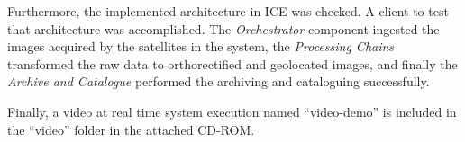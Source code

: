 Furthermore, the implemented architecture in ICE was checked. A client
to test that architecture was accomplished. The  \emph{Orchestrator}
component ingested the images acquired by the satellites in the system, the
\emph{Processing Chains} transformed the raw data to orthorectified and
geolocated images, and finally the \emph{Archive and Catalogue} performed the
archiving and cataloguing successfully. 

Finally, a video at real time system execution named
``video-demo'' is included in the ``video''
folder in the attached CD-ROM.

